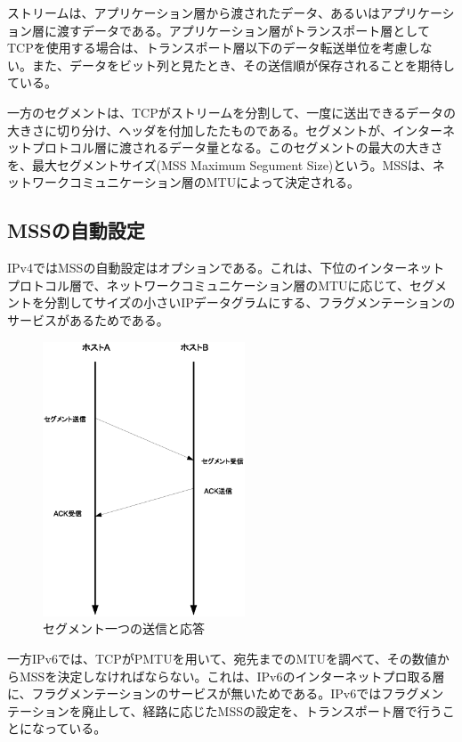 ストリームは、アプリケーション層から渡されたデータ、あるいはアプリケーション層に渡すデータである。アプリケーション層がトランスポート層としてTCPを使用する場合は、トランスポート層以下のデータ転送単位を考慮しない。また、データをビット列と見たとき、その送信順が保存されることを期待している。

一方のセグメントは、TCPがストリームを分割して、一度に送出できるデータの大きさに切り分け、ヘッダを付加したたものである。セグメントが、インターネットプロトコル層に渡されるデータ量となる。このセグメントの最大の大きさを、最大セグメントサイズ(MSS Maximum Segument Size)という。MSSは、ネットワークコミュニケーション層のMTUによって決定される。

\subsection{MSSの自動設定}

IPv4ではMSSの自動設定はオプションである。これは、下位のインターネットプロトコル層で、ネットワークコミュニケーション層のMTUに応じて、セグメントを分割してサイズの小さいIPデータグラムにする、フラグメンテーションのサービスがあるためである。

\begin{figure}
	\includegraphics[width=6cm, clip]{draw/tcp01n.eps}
	\caption{セグメント一つの送信と応答}
	\label{fig:tcp01}
\end{figure}

一方IPv6では、TCPがPMTUを用いて、宛先までのMTUを調べて、その数値からMSSを決定しなければならない。これは、IPv6のインターネットプロ取る層に、フラグメンテーションのサービスが無いためである。IPv6ではフラグメンテーションを廃止して、経路に応じたMSSの設定を、トランスポート層で行うことになっている。


